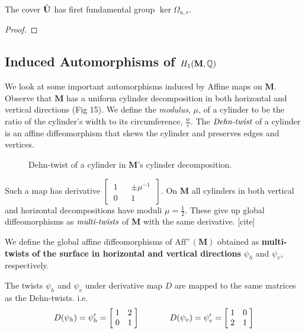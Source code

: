 \documentclass[]{article}
\def\bM{\mathbf{M}}
\begin{document}
\begin{thm}
The cover $\tilde{\mathbf{U}}$ has first fundamental group $\ker\Omega_{u,v}$.
\begin{proof}
\end{proof}
\end{thm}

\subsection{Induced Automorphisms of $H_1(\bM,\QQ)$}
We look at some important automorphisms induced by Affine maps on $\bM$. Observe that $\bM$ has a uniform cylinder decomposition in both horizontal and vertical directions (Fig 15). We define the \emph{modulus}, $\mu$, of a cylinder to be the ratio of the cylinder's width to its circumference, $\frac{w}{c}$. The $\emph{Dehn-twist}$ of a cylinder is an affine diffeomorphism that skews the cylinder and preserves edges and vertices.

\begin{figure}[H]
\centering

\label{fig:skew}
\caption{Dehn-twist of a cylinder in $\bM$'s cylinder decomposition.}
\end{figure}

Such a map has derivative $\left[~\begin{matrix}1 && \pm\mu^{-1}\\0 && 1\end{matrix}~\right]$. On $\bM$ all cylinders in both vertical and horizontal decompositions have moduli $\mu=\frac{1}{2}$. These give up global diffeomorphisms as $\emph{multi-twists}$ of $\bM$ with the same derivative. [cite] 

\begin{Def}
We define the global affine diffeomorphisms of $\text{Aff}^+(\bM)$ obtained as \textbf{multi-twists of the surface in horizontal and vertical directions} $\psi_h$ and $\psi_v$, respectively.
\end{Def}

The twists $\psi_h$ and $\psi_v$ under derivative map $D$ are mapped to the same matrices as the Dehn-twists. i.e.
\begin{align*}
D(\psi_h)=\psi_h'=\left[ \hspace{1mm} \begin{matrix}
				1 &   2\\
				0 & 1
			\end{matrix}\hspace{1mm}\right] \hspace{0.5in}
			D(\psi_v)=\psi_v'=\left[ \hspace{1mm} \begin{matrix}
							1 & 0\\
							 2 & 1
						\end{matrix}\hspace{1mm}\right]
\end{align*}
\end{document}
